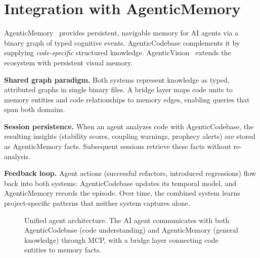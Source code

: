 \documentclass[10pt, twocolumn]{article}
\begin{document}
\section{Integration with AgenticMemory}
\label{sec:memory}

AgenticMemory~\cite{owolabi2025agenticmemory} provides persistent, navigable memory for AI agents via a binary graph of typed cognitive events. AgenticCodebase complements it by supplying \emph{code-specific} structured knowledge. AgenticVision~\cite{owolabi2025agenticvision} extends the ecosystem with persistent visual memory.

\textbf{Shared graph paradigm.} Both systems represent knowledge as typed, attributed graphs in single binary files. A bridge layer maps code units to memory entities and code relationships to memory edges, enabling queries that span both domains.

\textbf{Session persistence.} When an agent analyzes code with AgenticCodebase, the resulting insights (stability scores, coupling warnings, prophecy alerts) are stored as AgenticMemory facts. Subsequent sessions retrieve these facts without re-analysis.

\textbf{Feedback loop.} Agent actions (successful refactors, introduced regressions) flow back into both systems: AgenticCodebase updates its temporal model, and AgenticMemory records the episode. Over time, the combined system learns project-specific patterns that neither system captures alone.

\begin{figure}[t]
\centering
{}
\caption{Unified agent architecture. The AI agent communicates with both AgenticCodebase (code understanding) and AgenticMemory (general knowledge) through MCP, with a bridge layer connecting code entities to memory facts.}
\label{fig:agentarch}
\end{figure}
\end{document}

